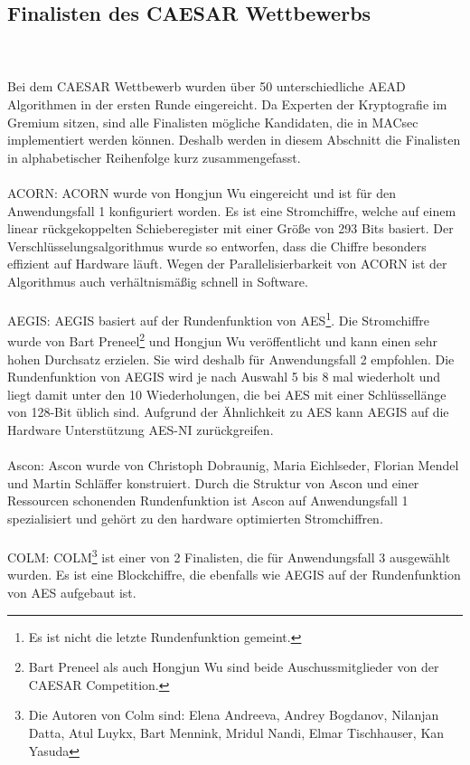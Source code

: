 \subsection{Finalisten des CAESAR Wettbewerbs}\\
\\
Bei dem CAESAR Wettbewerb wurden über 50 unterschiedliche \gls{AEAD} Algorithmen in der ersten Runde eingereicht. Da Experten der Kryptografie im Gremium sitzen, sind alle Finalisten mögliche Kandidaten, die in \gls{MACsec} implementiert werden können. Deshalb werden in diesem Abschnitt die Finalisten in alphabetischer Reihenfolge kurz zusammengefasst.\\
\\
ACORN: 
ACORN wurde von Hongjun Wu eingereicht und ist für den Anwendungsfall 1 konfiguriert worden. Es ist eine Stromchiffre, welche auf einem linear rückgekoppelten Schieberegister mit einer Größe von 293 Bits basiert. Der Verschlüsselungsalgorithmus wurde so entworfen, dass die Chiffre besonders effizient auf Hardware läuft. Wegen der Parallelisierbarkeit von ACORN ist der Algorithmus auch verhältnismäßig schnell in Software\cite{ACORN}.
\\
\\
AEGIS:
AEGIS basiert auf der Rundenfunktion von \gls{AES}\footnote[2]{Es ist nicht die letzte Rundenfunktion gemeint.}. Die Stromchiffre wurde von Bart Preneel\footnote[3]{Bart Preneel als auch Hongjun Wu sind beide Auschussmitglieder von der CAESAR Competition.} und Hongjun Wu veröffentlicht und kann einen sehr hohen Durchsatz erzielen. Sie wird deshalb für Anwendungsfall 2 empfohlen. Die Rundenfunktion von AEGIS wird je nach Auswahl 5 bis 8 mal wiederholt und liegt damit unter den 10 Wiederholungen, die bei AES mit einer Schlüssellänge von 128-Bit üblich sind. Aufgrund der Ähnlichkeit zu AES kann AEGIS auf die Hardware Unterstützung \gls{AES-NI} zurückgreifen\cite{AEGIS}.
\\
\\
Ascon:
Ascon wurde von Christoph Dobraunig, Maria Eichlseder, Florian Mendel und Martin Schläffer konstruiert. Durch die Struktur von Ascon und einer Ressourcen schonenden Rundenfunktion ist Ascon auf Anwendungsfall 1 spezialisiert und gehört zu den hardware optimierten Stromchiffren\cite{Ascon}.\\
\\
COLM:
COLM\footnote[4]{Die Autoren von Colm sind: Elena Andreeva, Andrey Bogdanov, Nilanjan Datta, Atul Luykx, Bart Mennink, Mridul Nandi, Elmar Tischhauser, Kan Yasuda} ist einer von 2 Finalisten, die für Anwendungsfall 3 ausgewählt wurden. Es ist eine Blockchiffre, die ebenfalls wie AEGIS auf der Rundenfunktion von AES aufgebaut ist\cite{COLM}.\\
